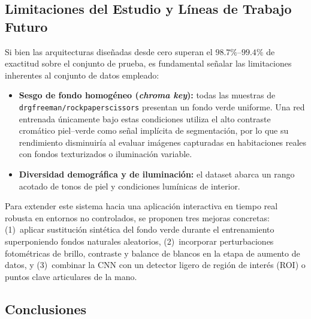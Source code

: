 \subsection{Limitaciones del Estudio y Líneas de Trabajo Futuro}

Si bien las arquitecturas diseñadas desde cero superan el $98.7\%$--$99.4\%$ de exactitud sobre el conjunto de prueba, es fundamental señalar las limitaciones inherentes al conjunto de datos empleado:
\begin{itemize}
    \item \textbf{Sesgo de fondo homogéneo (\textit{chroma key}):} todas las muestras de \texttt{drgfreeman/rockpaperscissors} presentan un fondo verde uniforme. Una red entrenada únicamente bajo estas condiciones utiliza el alto contraste cromático piel--verde como señal implícita de segmentación, por lo que su rendimiento disminuiría al evaluar imágenes capturadas en habitaciones reales con fondos texturizados o iluminación variable.
    \item \textbf{Diversidad demográfica y de iluminación:} el dataset abarca un rango acotado de tonos de piel y condiciones lumínicas de interior.
\end{itemize}

Para extender este sistema hacia una aplicación interactiva en tiempo real robusta en entornos no controlados, se proponen tres mejoras concretas: (1)~aplicar sustitución sintética del fondo verde durante el entrenamiento superponiendo fondos naturales aleatorios, (2)~incorporar perturbaciones fotométricas de brillo, contraste y balance de blancos en la etapa de aumento de datos, y (3)~combinar la CNN con un detector ligero de región de interés (ROI) o puntos clave articulares de la mano.

\subsection{Conclusiones}

